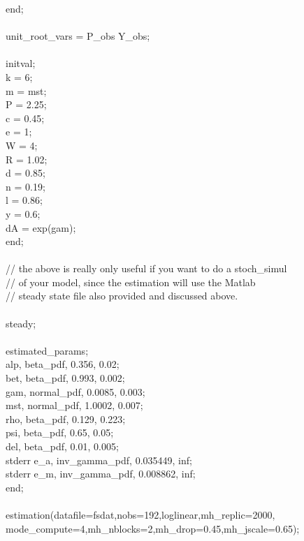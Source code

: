{end;\\
\\
unit\_root\_vars = P\_obs Y\_obs;\\
\\
initval;\\
k = 6;\\
m = mst;\\
P = 2.25;\\
c = 0.45;\\
e = 1;\\
W = 4;\\
R = 1.02;\\
d = 0.85;\\
n = 0.19;\\
l = 0.86;\\
y = 0.6;\\
dA = exp(gam);\\
end;\\
\\
// the above is really only useful if you want to do a stoch\_simul\\
// of your model, since the estimation will use the Matlab\\
// steady state file also provided and discussed above.\\
\\
steady;\\
\\
estimated\_params;\\
alp, beta\_pdf, 0.356, 0.02; \\ 
bet, beta\_pdf, 0.993, 0.002; \\
gam, normal\_pdf, 0.0085, 0.003; \\
mst, normal\_pdf, 1.0002, 0.007; \\
rho, beta\_pdf, 0.129, 0.223;\\
psi, beta\_pdf, 0.65, 0.05;\\
del, beta\_pdf, 0.01, 0.005;\\
stderr e\_a, inv\_gamma\_pdf, 0.035449, inf;\\
stderr e\_m, inv\_gamma\_pdf, 0.008862, inf;\\
end;\\
\\
estimation(datafile=fsdat,nobs=192,loglinear,mh\_replic=2000,\\
mode\_compute=4,mh\_nblocks=2,mh\_drop=0.45,mh\_jscale=0.65);}\\
\\

